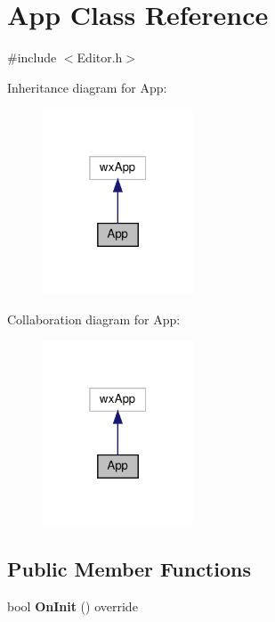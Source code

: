 \hypertarget{class_app}{}\section{App Class Reference}
\label{class_app}


{\ttfamily \#include $<$Editor.\+h$>$}



Inheritance diagram for App\+:
\nopagebreak
\begin{figure}[H]
\begin{center}
\leavevmode
\includegraphics[width=127pt]{class_app__inherit__graph}
\end{center}
\end{figure}


Collaboration diagram for App\+:
\nopagebreak
\begin{figure}[H]
\begin{center}
\leavevmode
\includegraphics[width=127pt]{class_app__coll__graph}
\end{center}
\end{figure}
\subsection*{Public Member Functions}
\begin{DoxyCompactItemize}
\item 
\mbox{\label{class_app_a2650bdfe2777549b496956a2be2b46c2}} 
bool {\bfseries On\+Init} () override
\end{DoxyCompactItemize}



